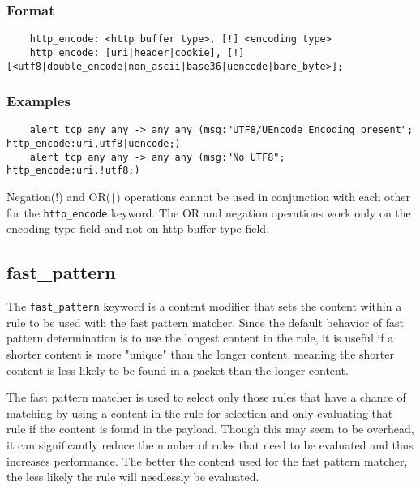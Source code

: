 \documentclass[english]{report}
\newenvironment{note}{
\samepage
    \vspace{10pt}{\textsf{
        {\hspace{7pt}\Huge{$\triangle$\hspace{-12.5pt}{\Large{$^!$}}}}\hspace{5pt}
        {\Large{NOTE}}
    }
    }
   \begin{center}
    \par\vspace{-17pt}

    \begin{lrbox}{\savepar}
    \begin{minipage}[r]{6in}
}
{
    \end{minipage}
    \end{lrbox}
    \fbox{
        \usebox{
            \savepar
	}
    }
    \par\vskip10pt
    \end{center}
}
\newenvironment{note}{
        \begin{rawhtml}
        <p><table border="1"><tr><td><b>
        Note:&nbsp;&nbsp;</b>
        \end{rawhtml}
}{
        \begin{rawhtml}
        </b></td></tr></table></p>
        \end{rawhtml}
}
\begin{document}
\subsubsection{Format}

\begin{verbatim}
    http_encode: <http buffer type>, [!] <encoding type>
    http_encode: [uri|header|cookie], [!][<utf8|double_encode|non_ascii|base36|uencode|bare_byte>];
\end{verbatim}

\subsubsection{Examples}
\begin{verbatim}
    alert tcp any any -> any any (msg:"UTF8/UEncode Encoding present"; http_encode:uri,utf8|uencode;)
    alert tcp any any -> any any (msg:"No UTF8"; http_encode:uri,!utf8;)
\end{verbatim}


\begin{note}

Negation(!) and OR({\tt |}) operations cannot be used in conjunction with each other for the 
\texttt{http\_encode} keyword. The OR and negation operations work only on the encoding type
field and not on http buffer type field.

\end{note}

\subsection{fast\_pattern}
\label{sub:FastPattern}

The \texttt{fast\_pattern} keyword is a content modifier that sets the content
within a rule to be used with the fast pattern matcher.  Since the default
behavior of fast pattern determination is to use the longest content in the
rule, it is useful if a shorter content is more "unique" than the longer content,
meaning the shorter content is less likely to be found in a packet than the
longer content.

The fast pattern matcher is used to select only those rules that have a
chance of matching by using a content in the rule for selection and only
evaluating that rule if the content is found in the payload.  Though this
may seem to be overhead, it can significantly reduce the number of rules
that need to be evaluated and thus increases performance.  The better the
content used for the fast pattern matcher, the less likely the rule will
needlessly be evaluated.
\end{document}
